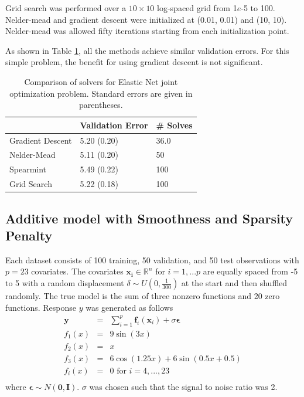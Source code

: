 \documentclass[12pt]{article}
\begin{document}
Grid search was performed over a $10 \times 10$ log-spaced grid from 1$e$-5 to 100. Nelder-mead and gradient descent were initialized at (0.01, 0.01) and (10, 10). Nelder-mead was allowed fifty iterations starting from each initialization point.

As shown in Table \ref{tab:elasticnet}, all the methods achieve similar validation errors. For this simple problem, the benefit for using gradient descent is not significant.

\begin{table}
\caption {\label{tab:elasticnet} Comparison of solvers for Elastic Net joint optimization problem. Standard errors are given in parentheses.}
\centering
\begin{tabular}{| l | l | l | }
\hline
& Validation Error & \# Solves\\
\hline
Gradient Descent & 5.20 (0.20) & 36.0 \\
\hline
Nelder-Mead & 5.11 (0.20) & 50 \\
\hline
Spearmint & 5.49 (0.22) & 100 \\
\hline
Grid Search & 5.22 (0.18) & 100 \\
\hline
\end{tabular}
\end{table}


\subsection{Additive model with Smoothness and Sparsity Penalty}
Each dataset consists of 100 training, 50 validation, and 50 test observations with $p=23$ covariates. The covariates $\boldsymbol{x_i} \in \mathbb{R}^{n}$ for $i=1,...p$ are equally spaced from -5 to 5 with a random displacement $ \delta \sim U(0, \frac{1}{300}) $ at the start and then shuffled randomly. The true model is the sum of three nonzero functions and 20 zero functions. Response $y$ was generated as follows
\begin{eqnarray*}
\boldsymbol y &=& \sum\limits_{i=1}^p \boldsymbol f_i(\boldsymbol x_i) + \sigma \boldsymbol \epsilon\\
f_1(x) &=& 9 \sin(3x)\\
f_2(x) &=& x\\
f_3(x) &=& 6 \cos(1.25 x) + 6 \sin(0.5 x + 0.5)\\
f_i(x) &=& 0 \text{ for }   i=4,...,23\\
\end{eqnarray*}
where $\boldsymbol \epsilon \sim N(\boldsymbol 0, \boldsymbol I)$. $\sigma$ was chosen such that the signal to noise ratio was 2.
\end{document}
